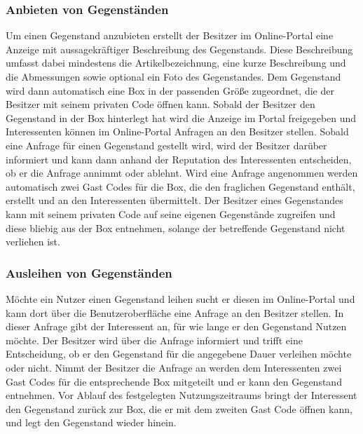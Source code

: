 \documentclass[a4paper]{scrartcl}
\begin{document}
\begin{multicols}{2}
			\subsubsection{Anbieten von Gegenst\"anden}
				Um einen Gegenstand anzubieten erstellt der Besitzer im Online-Portal eine Anzeige mit aussagekr\"aftiger Beschreibung des Gegenstands. Diese Beschreibung umfasst dabei mindestens die Artikelbezeichnung, eine kurze Beschreibung und die  Abmessungen sowie optional ein Foto des Gegenstandes. Dem Gegenstand wird dann automatisch eine Box in der passenden Gr\"o\ss e zugeordnet, die der Besitzer mit seinem privaten Code \"offnen kann. Sobald der Besitzer den Gegenstand in der Box hinterlegt hat wird die Anzeige im Portal freigegeben und Interessenten k\"onnen im Online-Portal Anfragen an den Besitzer stellen. Sobald eine Anfrage f\"ur einen Gegenstand gestellt wird, wird der Besitzer dar\"uber informiert und kann dann anhand der Reputation des Interessenten entscheiden, ob er die Anfrage annimmt oder ablehnt. Wird eine Anfrage angenommen werden automatisch zwei Gast Codes f\"ur die Box, die den fraglichen Gegenstand enth\"alt, erstellt und an den Interessenten \"ubermittelt. Der Besitzer eines Gegenstandes kann mit seinem privaten Code auf seine eigenen Gegenst\"ande zugreifen und diese bliebig aus der Box entnehmen, solange der betreffende Gegenstand nicht verliehen ist.
				
			
			
			\subsubsection{Ausleihen von Gegenst\"anden}
				M\"ochte ein Nutzer einen Gegenstand leihen sucht er diesen im Online-Portal und kann dort \"uber die Benutzeroberfl\"ache eine Anfrage an den Besitzer stellen. In dieser Anfrage gibt der Interessent an, f\"ur wie lange er den Gegenstand Nutzen m\"ochte. Der Besitzer wird \"uber die Anfrage informiert und trifft eine Entscheidung, ob er den Gegenstand f\"ur die angegebene Dauer verleihen m\"ochte oder nicht. Nimmt der Besitzer die Anfrage an werden dem Interessenten zwei Gast Codes f\"ur die entsprechende Box mitgeteilt und er kann den Gegenstand entnehmen. Vor Ablauf des festgelegten Nutzungszeitraums bringt der Interessent den Gegenstand zur\"uck zur Box, die er mit dem zweiten Gast Code \"offnen kann, und legt den Gegenstand wieder hinein.
				
			
			

\end{multicols}
\end{document}
